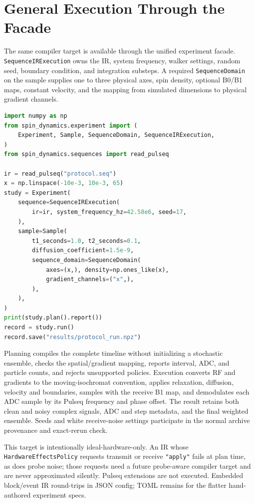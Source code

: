 \documentclass[11pt,oneside]{report}
\newcommand{\code}[1]{\texttt{#1}}
\begin{document}
\section{General Execution Through the Facade}

The same compiler target is available through the unified experiment facade.
\code{SequenceIRExecution} owns the IR, system frequency, walker settings,
random seed, boundary condition, and integration substeps. A required
\code{SequenceDomain} on the sample supplies one to three physical axes, spin
density, optional B0/B1 maps, constant velocity, and the mapping from simulated
dimensions to physical gradient channels.

\newpage
\begin{lstlisting}[language=Python]
import numpy as np
from spin_dynamics.experiment import (
    Experiment, Sample, SequenceDomain, SequenceIRExecution,
)
from spin_dynamics.sequences import read_pulseq

ir = read_pulseq("protocol.seq")
x = np.linspace(-10e-3, 10e-3, 65)
study = Experiment(
    sequence=SequenceIRExecution(
        ir=ir, system_frequency_hz=42.58e6, seed=17,
    ),
    sample=Sample(
        t1_seconds=1.0, t2_seconds=0.1,
        diffusion_coefficient=1.5e-9,
        sequence_domain=SequenceDomain(
            axes=(x,), density=np.ones_like(x),
            gradient_channels=("x",),
        ),
    ),
)
print(study.plan().report())
record = study.run()
record.save("results/protocol_run.npz")
\end{lstlisting}

Planning compiles the complete timeline without initializing a stochastic
ensemble, checks the spatial/gradient mapping, reports interval, ADC, and
particle counts, and rejects unsupported policies. Execution converts RF and
gradients to the moving-isochromat convention, applies relaxation, diffusion,
velocity and boundaries, samples with the receive B1 map, and demodulates each
ADC sample by its Pulseq frequency and phase offset. The result retains both
clean and noisy complex signals, ADC and step metadata, and the final weighted
ensemble. Seeds and white receive-noise settings participate in the normal
archive provenance and exact-rerun check.

This target is intentionally ideal-hardware-only. An IR whose
\code{HardwareEffectsPolicy} requests transmit or receive \code{"apply"} fails
at plan time, as does probe noise; those requests need a future probe-aware
compiler target and are never approximated silently. Pulseq extensions are not
executed. Embedded block/event IR round-trips in JSON config; TOML remains for
the flatter hand-authored experiment specs.
\end{document}
